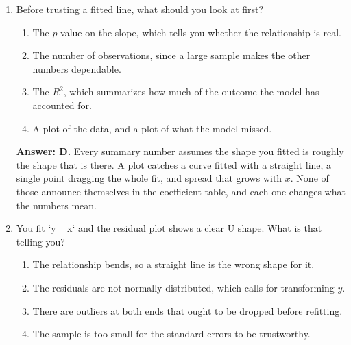 \documentclass[11pt]{article}
\begin{document}
\begin{enumerate}[itemsep=14pt]
\vspace{2pt}
\textbf{Answer: B.} A line describes the relationship inside the range you observed. Out past the edge of the data the model still returns a number, confidently and with no warning, and that number rests on an assumption nobody checked. The honest answer is that this sale is outside what the data covers.
\vspace{4pt}

\item Before trusting a fitted line, what should you look at first?

\begin{enumerate}[label=\Alph*., itemsep=1pt, topsep=3pt]
  \item The $p$-value on the slope, which tells you whether the relationship is real.
  \item The number of observations, since a large sample makes the other numbers dependable.
  \item The $R^2$, which summarizes how much of the outcome the model has accounted for.
  \item A plot of the data, and a plot of what the model missed.
\end{enumerate}

\vspace{2pt}
\textbf{Answer: D.} Every summary number assumes the shape you fitted is roughly the shape that is there. A plot catches a curve fitted with a straight line, a single point dragging the whole fit, and spread that grows with $x$. None of those announce themselves in the coefficient table, and each one changes what the numbers mean.
\vspace{4pt}

\item You fit `y ~ x` and the residual plot shows a clear U shape. What is that telling you?

\begin{enumerate}[label=\Alph*., itemsep=1pt, topsep=3pt]
  \item The relationship bends, so a straight line is the wrong shape for it.
  \item The residuals are not normally distributed, which calls for transforming $y$.
  \item There are outliers at both ends that ought to be dropped before refitting.
  \item The sample is too small for the standard errors to be trustworthy.
\end{enumerate}


\end{enumerate}
\end{document}
